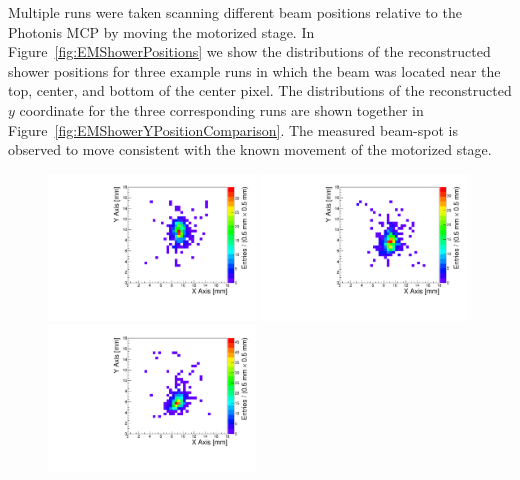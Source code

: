 \documentclass[12pt]{article}
\begin{document}
{Multiple runs were taken scanning different beam positions relative to the Photonis MCP by moving
the motorized stage. In Figure~\ref{fig:EMShowerPositions} we show the distributions of the
reconstructed shower positions for three example runs in which the beam was
located near the top, center, and bottom of the center pixel. The distributions
of the reconstructed $y$ coordinate for the three corresponding runs are shown 
together in Figure~\ref{fig:EMShowerYPositionComparison}. The measured 
beam-spot is observed to move consistent with the known movement of the 
motorized stage. 
\begin{figure}[htbp]
  \centering
  \includegraphics[width=0.49\textwidth]{Images/centers/run30dist.pdf}
  \includegraphics[width=0.49\textwidth]{Images/centers/run32dist.pdf}
  \includegraphics[width=0.49\textwidth]{Images/centers/run34dist.pdf}
  

\end{figure}}
\end{document}
